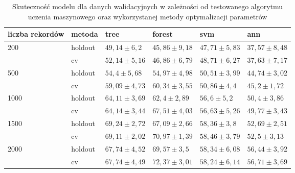 \begin{table}[]
\centering
\begin{tabular}{|l|l|l|l|l|l|}
\hline
liczba rekordów       & metoda   & tree & forest & svm & ann \\ \hline
\multirow{2}{*}{200}     & holdout    & $ 49,14 \pm 6,2$ & $45,86 \pm 9,18$ & $47,71 \pm 5,83$ & $37,57 \pm 8,48$ \\ \cline{2-6} 
                         & cv         & $52,14 \pm 5,16$ & $46,86 \pm 6,79$ & $48,71 \pm 6,27$ & $37,63 \pm 7,17$ \\ \hline
\multirow{2}{*}{500}     & holdout    & $54,4 \pm 5,68$ & $54,97 \pm 4,98$ & $50,51 \pm 3,99$ & $44,74 \pm 3,02$ \\ \cline{2-6} 
                         & cv         & $59,09 \pm 4,73$ & $60,34 \pm 3,55$ & $50,86 \pm 4,4$ & $45,2 \pm 1,72$ \\ \hline
\multirow{2}{*}{1000}    & holdout    & $64,11 \pm 3,69$ & $62,4 \pm 2,89$ & $56,6 \pm 5,2$ & $50,4 \pm 3,86$ \\ \cline{2-6} 
                         & cv         & $64,14 \pm 3,44$ & $67,51 \pm 4,03$ & $56,63 \pm 5,26$ & $49,77 \pm 3,43$ \\\hline
\multirow{2}{*}{1500}    & holdout    &$ 69,24 \pm 2,72$ & $67,09 \pm 2,66$ & $58,36 \pm 3,8$ & $52,69 \pm 2,51$ \\ \cline{2-6} 
                         & cv         & $69,11 \pm 2,02$ & $70,97 \pm 1,39$ & $58,46 \pm 3,79$ & $52,5 \pm 3,13$ \\ \hline
\multirow{2}{*}{2000}    & holdout    & $67,74 \pm 4,52$ & $69,57 \pm 3,5$ & $58,34 \pm 6,08$ & $56,44 \pm 3,92$ \\ \cline{2-6} 
                         & cv         & $67,74 \pm 4,49$ & $72,37 \pm 3,01$ & $58,24 \pm 6,14$ & $56,71 \pm 3,69$ \\ \hline
\end{tabular}
\caption{Skuteczność modelu dla danych walidacyjnych w zależności od testowanego algorytmu uczenia maszynowego oraz wykorzystanej metody optymalizacji parametrów} \label{table:cv}
\end{table}

\newcommand{\cvsize}{1}


